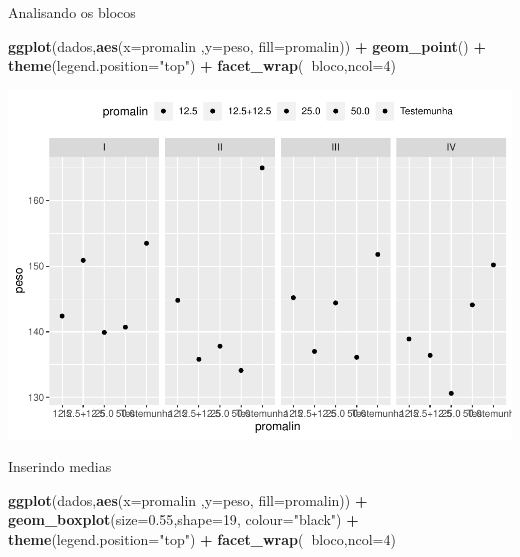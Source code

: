 \documentclass[
]{book}
\newenvironment{Shaded}{\begin{snugshade}}{\end{snugshade}}
\newcommand{\DataTypeTok}[1]{\textcolor[rgb]{0.13,0.29,0.53}{#1}}
\newcommand{\DecValTok}[1]{\textcolor[rgb]{0.00,0.00,0.81}{#1}}
\newcommand{\FloatTok}[1]{\textcolor[rgb]{0.00,0.00,0.81}{#1}}
\newcommand{\KeywordTok}[1]{\textcolor[rgb]{0.13,0.29,0.53}{\textbf{#1}}}
\newcommand{\NormalTok}[1]{#1}
\newcommand{\OperatorTok}[1]{\textcolor[rgb]{0.81,0.36,0.00}{\textbf{#1}}}
\newcommand{\StringTok}[1]{\textcolor[rgb]{0.31,0.60,0.02}{#1}}
\begin{document}
Analisando os blocos

\begin{Shaded}
\begin{Highlighting}[]
\KeywordTok{ggplot}\NormalTok{(dados,}\KeywordTok{aes}\NormalTok{(}\DataTypeTok{x=}\NormalTok{promalin ,}\DataTypeTok{y=}\NormalTok{peso, }\DataTypeTok{fill=}\NormalTok{promalin)) }\OperatorTok{+}\StringTok{ }
\StringTok{       }\KeywordTok{geom_point}\NormalTok{() }\OperatorTok{+}\StringTok{ }
\StringTok{       }\KeywordTok{theme}\NormalTok{(}\DataTypeTok{legend.position=}\StringTok{"top"}\NormalTok{) }\OperatorTok{+}\StringTok{ }
\StringTok{       }\KeywordTok{facet_wrap}\NormalTok{(}\OperatorTok{~}\NormalTok{bloco,}\DataTypeTok{ncol=}\DecValTok{4}\NormalTok{)}
\end{Highlighting}
\end{Shaded}

\includegraphics{TudodoR_files/figure-latex/unnamed-chunk-233-1.pdf}

Inserindo medias

\begin{Shaded}
\begin{Highlighting}[]
\KeywordTok{ggplot}\NormalTok{(dados,}\KeywordTok{aes}\NormalTok{(}\DataTypeTok{x=}\NormalTok{promalin ,}\DataTypeTok{y=}\NormalTok{peso, }\DataTypeTok{fill=}\NormalTok{promalin)) }\OperatorTok{+}\StringTok{ }
\StringTok{  }\KeywordTok{geom_boxplot}\NormalTok{(}\DataTypeTok{size=}\FloatTok{0.55}\NormalTok{,}\DataTypeTok{shape=}\DecValTok{19}\NormalTok{, }\DataTypeTok{colour=}\StringTok{"black"}\NormalTok{) }\OperatorTok{+}\StringTok{ }
\StringTok{  }\KeywordTok{theme}\NormalTok{(}\DataTypeTok{legend.position=}\StringTok{"top"}\NormalTok{) }\OperatorTok{+}\StringTok{ }
\StringTok{  }\KeywordTok{facet_wrap}\NormalTok{(}\OperatorTok{~}\NormalTok{bloco,}\DataTypeTok{ncol=}\DecValTok{4}\NormalTok{) }
\end{Highlighting}
\end{Shaded}
\end{document}

